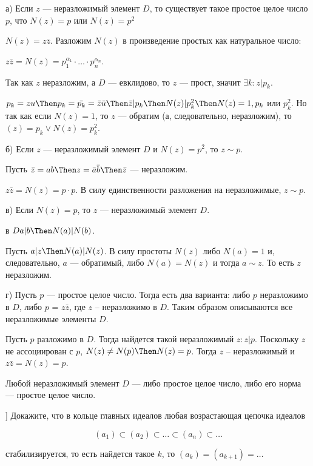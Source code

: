 \begin{solution}
а) Если \(z\) --- неразложимый элемент \(D\), то существует такое простое целое число \(p\), что \(N(z) = p\) или \(N(z) = p^2\)

\(N(z) = z\bar{z}\). Разложим \(N(z)\) в произведение простых как натуральное число:

\(z\bar{z} = N(z) = p_1^{\alpha_1} \cdot \ldots \cdot p_n^{\alpha_n}\).

Так как \(z\) неразложим, а \(D\) --- евклидово, то \(z\) --- прост, значит \(\exists k: z | p_k\).

\(p_k = zu \Then p_k = \bar{p_k} = \bar{z}\bar{u} \Then \bar{z} | p_k \Then N(z) | p_k^2 \Then N(z) = 1, p_k\) или \(p_k^2\). Но так как если \(N(z) = 1\), то \(z\) --- обратим (а, следовательно, неразложим), то \((z) = p_k \lor N(z) = p_k^2\).

б) Если \(z\) --- неразложимый элемент \(D\) и \(N(z) = p^2\), то \(z \sim p\).

Пусть \(\bar{z} = ab \Then z = \bar{a} \bar{b} \Then \bar{z}\) --- неразложим.

\(z \bar{z} = N(z) = p \cdot p\). В силу единственности разложения на неразложимые, \(z \sim p\).

в) Если \(N(z) = p\), то \(z\) --- неразложимый элемент \(D\).

в \(D a|b \Then N(a) | N(b)\).

Пусть \(a | z \Then N(a) | N(z)\). В силу простоты \(N(z)\) либо \(N(a) = 1\) и, следовательно, \(a\) --- обратимый, либо \(N(a) = N(z)\) и тогда \(a \sim z\). То есть \(z\) неразложим.

г) Пусть \(p\) --- простое целое число. Тогда есть два варианта: либо \(p\) неразложимо в \(D\), либо \(p\) = \(z\bar{z}\), где \(z\) -- неразложимо в \(D\). Таким образом описываются все неразложимые элементы \(D\).

Пусть \(p\) разложимо в \(D\). Тогда найдется такой неразложимый \(z: z|p\). Поскольку \(z\) не ассоциирован с \(p\), \(N(z) \ne N(p) \Then N(z) = p\). Тогда \(z\) -- неразложимый и \(z\bar{z} = N(z) = p\).

Любой неразложимый элемент \(D\) --- либо простое целое число, либо его норма --- простое целое число.
\end{solution}


\begin{problem}[25 [Каргальцев]]
Докажите, что в кольце главных идеалов любая возрастающая цепочка идеалов

$$ (a_1) \subset (a_2) \subset \ldots \subset (a_n) \subset \ldots $$

стабилизируется, то есть найдется такое $k$, то $(a_k) = (a_{k + 1}) = \ldots$
\end{problem}

